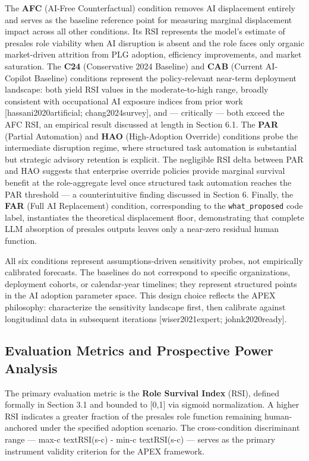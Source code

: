 \documentclass[10pt, conference]{IEEEtran}
\begin{document}
The \textbf{AFC} (AI-Free Counterfactual) condition removes AI displacement entirely and serves as the baseline reference point for measuring marginal displacement impact across all other conditions. Its RSI represents the model's estimate of presales role viability when AI disruption is absent and the role faces only organic market-driven attrition from PLG adoption, efficiency improvements, and market saturation. The \textbf{C24} (Conservative 2024 Baseline) and \textbf{CAB} (Current AI-Copilot Baseline) conditions represent the policy-relevant near-term deployment landscape: both yield RSI values in the moderate-to-high range, broadly consistent with occupational AI exposure indices from prior work [hassani2020artificial; chang2024survey], and --- critically --- both exceed the AFC RSI, an empirical result discussed at length in Section 6.1. The \textbf{PAR} (Partial Automation) and \textbf{HAO} (High-Adoption Override) conditions probe the intermediate disruption regime, where structured task automation is substantial but strategic advisory retention is explicit. The negligible RSI delta between PAR and HAO suggests that enterprise override policies provide marginal survival benefit at the role-aggregate level once structured task automation reaches the PAR threshold --- a counterintuitive finding discussed in Section 6. Finally, the \textbf{FAR} (Full AI Replacement) condition, corresponding to the \texttt{what\_proposed} code label, instantiates the theoretical displacement floor, demonstrating that complete LLM absorption of presales outputs leaves only a near-zero residual human function.

All six conditions represent assumptions-driven sensitivity probes, not empirically calibrated forecasts. The baselines do not correspond to specific organizations, deployment cohorts, or calendar-year timelines; they represent structured points in the AI adoption parameter space. This design choice reflects the APEX philosophy: characterize the sensitivity landscape first, then calibrate against longitudinal data in subsequent iterations [wiser2021expert; johnk2020ready].

\subsection{Evaluation Metrics and Prospective Power Analysis}

\label{sec:evaluation_metrics_and_prospective_power}

The primary evaluation metric is the \textbf{Role Survival Index} (RSI), defined formally in Section 3.1 and bounded to [0,1] via sigmoid normalization. A higher RSI indicates a greater fraction of the presales role function remaining human-anchored under the specified adoption scenario. The cross-condition discriminant range --- max-c textRSI(s-c) - min-c textRSI(s-c) --- serves as the primary instrument validity criterion for the APEX framework.
\end{document}
